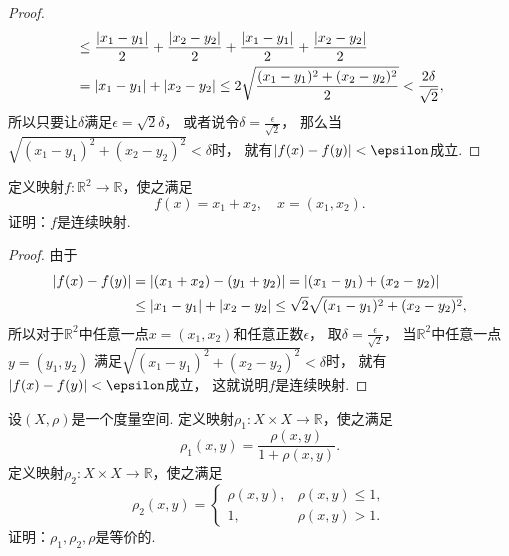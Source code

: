 \begin{example}
\begin{proof}
\begin{align*}
	&\leq \frac{\abs{x_1-y_1}}{2} + \frac{\abs{x_2-y_2}}{2} + \frac{\abs{x_1-y_1}}{2} + \frac{\abs{x_2-y_2}}{2} \\
	&= \abs{x_1-y_1} + \abs{x_2-y_2}
	\leq 2\sqrt{\frac{(x_1-y_1)^2+(x_2-y_2)^2}{2}}
	< \frac{2\delta}{\sqrt2},
\end{align*}
所以只要让\(\delta\)满足\(\epsilon = \sqrt2 \delta\)，
或者说令\(\delta = \frac{\epsilon}{\sqrt2}\)，
那么当\(\sqrt{(x_1-y_1)^2+(x_2-y_2)^2} < \delta\)时，
就有\(\abs{f(x) - f(y)} < \epsilon\)成立.
\end{proof}
\end{example}

\begin{example}
定义映射\(f\colon \mathbb{R}^2 \to \mathbb{R}\)，使之满足\begin{equation*}
	f(x) = x_1 + x_2,
	\quad x=(x_1,x_2).
\end{equation*}
证明：\(f\)是连续映射.
\begin{proof}
由于\begin{align*}
	\abs{f(x) - f(y)}
	&= \abs{
		(x_1 + x_2) - (y_1 + y_2)
	}
	= \abs{(x_1 - y_1) + (x_2 - y_2)} \\
	&\leq \abs{x_1 - y_1} + \abs{x_2 - y_2}
	\leq \sqrt2 \sqrt{(x_1-y_1)^2 + (x_2-y_2)^2},
\end{align*}
所以对于\(\mathbb{R}^2\)中任意一点\(x = (x_1,x_2)\)和任意正数\(\epsilon\)，
取\(\delta = \frac{\epsilon}{\sqrt2}\)，
当\(\mathbb{R}^2\)中任意一点\(y = (y_1,y_2)\)
满足\(\sqrt{(x_1-y_1)^2 + (x_2-y_2)^2} < \delta\)时，
就有\(\abs{f(x) - f(y)} < \epsilon\)成立，
这就说明\(f\)是连续映射.
\end{proof}
\end{example}

\begin{example}
设\((X,\rho)\)是一个度量空间.
定义映射\(\rho_1\colon X \times X \to \mathbb{R}\)，使之满足\begin{equation*}
	\rho_1(x,y) = \frac{\rho(x,y)}{1+\rho(x,y)}.
\end{equation*}
定义映射\(\rho_2\colon X \times X \to \mathbb{R}\)，使之满足\begin{equation*}
	\rho_2(x,y) = \left\{ \begin{array}{cl}
		\rho(x,y), & \rho(x,y) \leq 1, \\
		1, & \rho(x,y) > 1.
	\end{array} \right.
\end{equation*}
证明：\(\rho_1,\rho_2,\rho\)是等价的.
\end{example}
